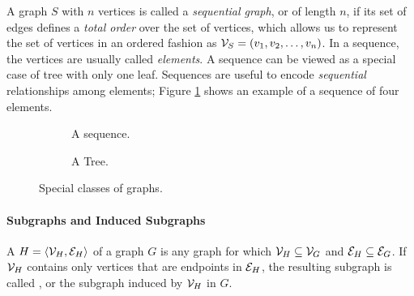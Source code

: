 A graph $S$ with $n$ vertices is called a \emph{sequential graph}, or  of length $n$, if its set of edges defines a \emph{total order} over the set of vertices, which allows us to represent the set of vertices in an ordered fashion as $\Cal{V}_S = (v_1, v_2, \ldots, v_n)$. In a sequence, the vertices are usually called \emph{elements}. A sequence can be viewed as a special case of tree with only one leaf. Sequences are useful to encode \emph{sequential} relationships among elements; Figure \ref{fig:sequence} shows an example of a sequence of four elements.
\begin{figure*}
    \begin{subfigure}[b]{0.49\linewidth}
        \centering
        \resizebox{.8\textwidth}{!}{}
        \caption{A sequence.}
        \label{fig:sequence}
    \end{subfigure}
    \begin{subfigure}[b]{0.49\linewidth}
        \centering
        \resizebox{.8\textwidth}{!}{}
        \caption{A Tree.}
        \label{fig:tree}
    \end{subfigure}
    \caption{Special classes of graphs.}
\end{figure*}

\paragraph{Subgraphs and Induced Subgraphs} A 
$H = \langle \Cal{V}_H, \Cal{E}_H \rangle$ of a graph $G$ is any graph for which $\Cal{V}_H \subseteq \Cal{V}_G$ and  $\Cal{E}_H \subseteq \Cal{E}_G$. If $\Cal{V}_H$ contains only vertices that are endpoints in $\Cal{E}_H$, the resulting subgraph is called , or the subgraph induced by $\Cal{V}_H$ in $G$.

